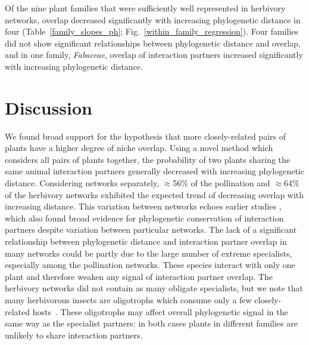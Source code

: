 \documentclass[12pt]{article}
\begin{document}
\begin{spacing}{1.5}
    Of the nine plant families that were sufficiently well represented in herbivory 
    networks, overlap decreased significantly with increasing phylogenetic distance in four 
    (Table~\ref{family_slopes_ph}; Fig.~\ref{within_family_regression}). Four
    families did not show significant relationships between phylogenetic distance and overlap,
    and in one family, \emph{Fabaceae}, overlap of interaction partners increased significantly with 
    increasing phylogenetic distance.


\section*{Discussion} 


  We found broad support for the hypothesis that more
  closely-related pairs of plants have a higher degree
  of niche overlap. Using a novel method which considers
  all pairs of plants together, 
  the probability of two plants sharing the same animal 
  interaction partners generally decreased with increasing 
  phylogenetic distance. Considering networks separately,
  $\approx$56\%  of the pollination and $\approx$64\% of the 
  herbivory networks exhibited the expected trend of decreasing 
  overlap with increasing distance. This variation between networks
  echoes earlier studies \citep[e.g.,][]{Fontaine2015,Hutchinson2017},
  which also found broad evidence for phylogenetic conservation 
  of interaction partners despite variation between particular 
  networks. The lack of a significant relationship between
  phylogenetic distance and interaction partner overlap in many
  networks could be partly due to the large number of extreme
  specialists, especially among the pollination networks.
  These species interact with only one plant and
  therefore weaken any signal of interaction partner overlap.
  The herbivory networks did not contain as many obligate 
  specialists, but we note that many herbivorous insects are
  oligotrophs which consume only a few closely-related 
  hosts~\citep{Novotny2005,Yguel2011}.
  These oligotrophs may affect overall phylogenetic signal in the same
  way as the specialist partners: in both cases plants in different
  families are unlikely to share interaction partners.



\end{spacing}
\end{document}
